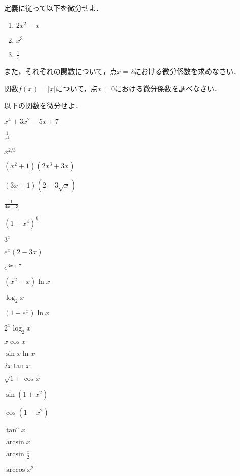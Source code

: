 \begin{question}
	定義に従って以下を微分せよ．
	\begin{enumerate}[itemsep=2ex, label*=(\arabic*)]
		\item $\displaystyle 2x^2 - x$
		\item $\displaystyle x^3$
		\item $\displaystyle \frac{1}{x}$
	\end{enumerate}
	また，それぞれの関数について，点$x = 2$における微分係数を求めなさい．
\end{question}

\begin{question}
	関数$f(x) = |x|$について，点$x = 0$における微分係数を調べなさい．
\end{question}

\begin{question}
	以下の関数を微分せよ．
	\begin{tabenum}[(1)]
		\item $\displaystyle x^4+3x^2-5x+7$
		\item $\displaystyle \frac{1}{x^2}$
		\item $\displaystyle x^{2/3}$
		\item $\displaystyle (x^2+1)(2x^3+3x)$ \\[2ex]
		\item $\displaystyle (3x+1)(2-3\sqrt{x})$
		\item $\displaystyle \frac{1}{4x+3}$
		\item $\displaystyle (1+x^4)^6$
		\item $\displaystyle 3^x$ \\[2ex]
		\item $\displaystyle e^x(2-3x)$
		\item $\displaystyle e^{3x+7}$
		\item $\displaystyle (x^2-x)\ln x$
		\item $\displaystyle \log_{2}x$ \\[2ex]
		\item $\displaystyle (1+e^x)\ln x$
		\item $\displaystyle 2^x\log_{2} x$
		\item $\displaystyle x\cos x$
		\item $\displaystyle \sin x\ln x$ \\[2ex]
		\item $\displaystyle 2x\tan x$
		\item $\displaystyle \sqrt{1 + \cos x}$
		\item $\displaystyle \sin(1+x^2)$
		\item $\displaystyle \cos(1-x^2)$ \\[2ex]
		\item $\displaystyle \tan^5x$
		\item $\displaystyle \arcsin x$
		\item $\displaystyle \arcsin\frac{x}{2}$
		\item $\displaystyle \arccos x^2$ \\[2ex]
	\end{tabenum}
\end{question}

